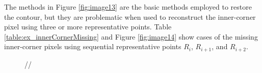 
The methods in Figure \ref{fig:image13} are the basic methods employed to restore the contour, but they are problematic when used to reconstruct the inner-corner pixel using three or more representative points. Table \ref{table:ex_innerCornerMissing} and Figure \ref{fig:image14} show cases of the missing inner-corner pixels using sequential representative points $R_i$, $R_{i+1}$, and $R_{i+2}$.

\begin{figure}[htbp]
	\centering
	 //

\end{figure}
